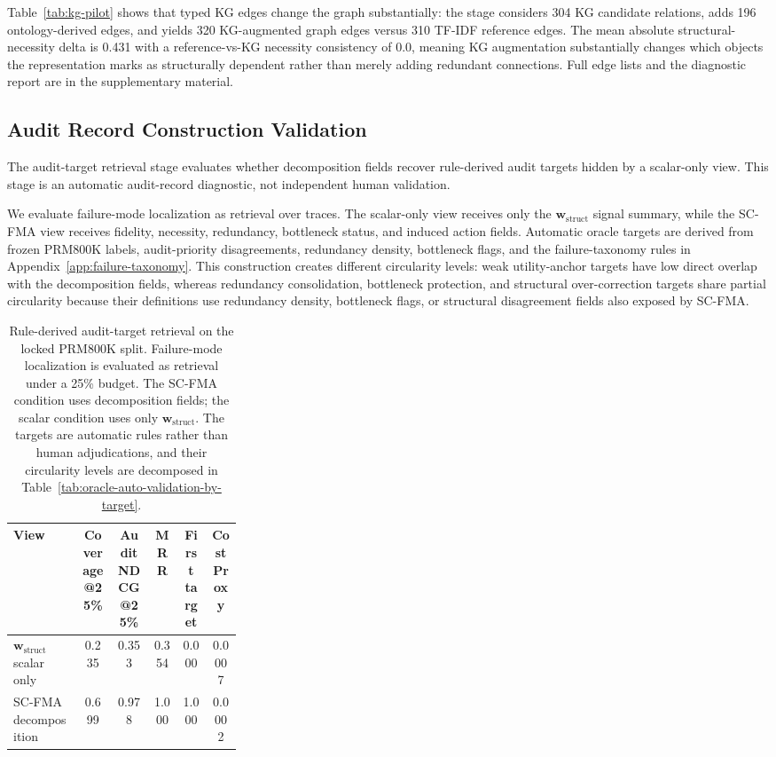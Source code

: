 \documentclass[a4paper,fleqn]{cas-sc}
\newcommand{\wstruct}{\ensuremath{\mathbf{w}_{\mathrm{struct}}}}
\begin{document}
Table~\ref{tab:kg-pilot} shows that typed KG edges change the graph substantially: the stage considers 304 KG candidate relations, adds 196 ontology-derived edges, and yields 320 KG-augmented graph edges versus 310 TF-IDF reference edges. The mean absolute structural-necessity delta is 0.431 with a reference-vs-KG necessity consistency of 0.0, meaning KG augmentation substantially changes which objects the representation marks as structurally dependent rather than merely adding redundant connections. Full edge lists and the diagnostic report are in the supplementary material.

\subsection{Audit Record Construction Validation}
\label{sec:why-calibration}
\label{sec:audit-results}
\label{sec:oracle-auto-validation}

The audit-target retrieval stage evaluates whether decomposition fields recover rule-derived audit targets hidden by a scalar-only view. This stage is an automatic audit-record diagnostic, not independent human validation.

We evaluate failure-mode localization as retrieval over traces. The scalar-only view receives only the \wstruct{} signal summary, while the SC-FMA view receives fidelity, necessity, redundancy, bottleneck status, and induced action fields. Automatic oracle targets are derived from frozen PRM800K labels, audit-priority disagreements, redundancy density, bottleneck flags, and the failure-taxonomy rules in Appendix~\ref{app:failure-taxonomy}. This construction creates different circularity levels: weak utility-anchor targets have low direct overlap with the decomposition fields, whereas redundancy consolidation, bottleneck protection, and structural over-correction targets share partial circularity because their definitions use redundancy density, bottleneck flags, or structural disagreement fields also exposed by SC-FMA.

\begin{table}[ht]
\caption{Rule-derived audit-target retrieval on the locked PRM800K split. Failure-mode localization is evaluated as retrieval under a 25\% budget. The SC-FMA condition uses decomposition fields; the scalar condition uses only \wstruct{}. The targets are automatic rules rather than human adjudications, and their circularity levels are decomposed in Table~\ref{tab:oracle-auto-validation-by-target}.}
\label{tab:oracle-auto-validation}
\centering
\small
\renewcommand{\arraystretch}{1.08}
\begin{tabular}{Z{0.30\linewidth}ccccc}
\toprule
\textbf{View} & \textbf{Coverage@25\%} & \textbf{Audit NDCG@25\%} & \textbf{MRR} & \textbf{First target} & \textbf{Cost Proxy} \\
\midrule
\wstruct{} scalar only & 0.235 & 0.353 & 0.354 & 0.000 & 0.0007 \\
SC-FMA decomposition & 0.699 & 0.978 & 1.000 & 1.000 & 0.0002 \\
\bottomrule
\end{tabular}
\end{table}
\end{document}
